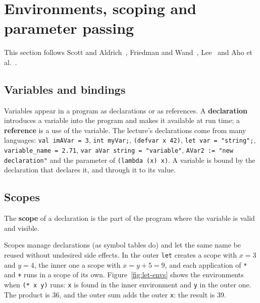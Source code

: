 \section{Environments, scoping and parameter passing}
\label{sec:scoping}

This section follows Scott and Aldrich~\cite[Ch.~3]{scott2025pragmatics},
Friedman and Wand~\cite[Sec.~3.5--3.7]{friedman2008essentials},
Lee~\cite[Sec.~5.9]{lee2017foundations} and Aho et
al.~\cite[Sec.~1.6]{aho2007compilers}.

\subsection{Variables and bindings}

Variables appear in a program as declarations or as references. A
\textbf{declaration} introduces a variable into the program and makes it
available at run time; a \textbf{reference} is a use of the variable. The
lecture's declarations come from many languages: \texttt{val imAVar = 3},
\texttt{int myVar;}, \texttt{(defvar x 42)}, \texttt{let var = "string";},
\texttt{variable\_name = 2.71}, \texttt{var aVar string = "variable"},
\texttt{AVar2 := "new declaration"} and the parameter of
\texttt{(lambda (x) x)}. A variable is bound by the declaration that declares
it, and through it to its value.

\subsection{Scopes}

\begin{definition}
The \textbf{scope} of a declaration is the part of the program where the
variable is valid and visible.
\end{definition}

Scopes manage declarations (as symbol tables do) and let the same name be
reused without undesired side effects. In
the outer \texttt{let} creates a scope with $x = 3$ and $y = 4$, the inner one a
scope with $x = y + 5 = 9$, and each application of \texttt{*} and \texttt{+}
runs in a scope of its own. Figure~\ref{fig:let-envs} shows the environments
when \texttt{(* x y)} runs: \texttt{x} is found in the inner environment and
\texttt{y} in the outer one. The product is 36, and the outer sum adds the
outer \texttt{x}: the result is 39.

